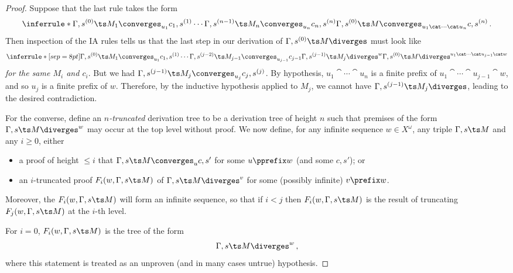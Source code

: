 \begin{proof}
  Suppose that the last rule takes the form
  \[
    \inferrule*{\Gamma,s^{(0)}\ts M_1\converges_{u_1} c_1,s^{(1)} \\ \cdots \\ \Gamma,s^{(n-1)}\ts M_n\converges_{u_n} c_n,s^{(n)}}
    {\Gamma,s^{(0)} \ts M \converges_{u_1\cat \cdots\cat u_n} c,s^{(n)}}\,.
    \]
  Then inspection of the IA rules tells us that the last step in our derivation of $\Gamma,s^{(0)} \ts M\diverges$ must look like
  \[
    \inferrule*[sep=8pt]{\Gamma,s^{(0)}\ts M_1 \converges_{u_1} c_1,s^{(1)} \\ \cdots \\ \Gamma,s^{(j-2)} \ts M_{j-1} \converges_{u_{j-1}} c_{j-1} \\ \Gamma,s^{(j-1)}\ts M_j\diverges^w}
    {\Gamma,s^{(0)} \ts M \diverges^{u_1\cat \cdots \cat u_{j-1}\cat w}}
    \]
  \emph{for the same $M_i$ and $c_i$}.
  But we had $\Gamma,s^{(j-1)}\ts M_j\converges_{u_j} c_j,s^{(j)}$.  
  By hypothesis, $u_1\cat \cdots \cat u_n$ is a finite prefix of $u_1 \cat \cdots \cat u_{j-1} \cat w$, and so $u_j$ is a finite prefix of $w$.  
  Therefore, by the inductive hypothesis applied to $M_j$, we cannot have $\Gamma,s^{(j-1)}\ts M_j\diverges$, leading to the desired contradiction.

  For the converse, define an \emph{$n$-truncated} derivation tree to be a derivation tree of height $n$ such that premises of the form $\Gamma,s\ts M\diverges^w$ may occur at the top level without proof.  
  We now define, for any infinite sequence $w\in X^\omega$, any triple $\Gamma,s\ts M$ and any $i\ge 0$, either
  \begin{itemize}
    \item a proof of height $\le i$ that $\Gamma,s\ts M\converges_u c,s'$ for some $u\pprefix w$ (and some $c,s'$); or
    \item an $i$-truncated proof $F_i(w,\Gamma,s\ts M)$ of $\Gamma,s\ts M\diverges^v$ for some (possibly infinite) $v\prefix w$.
  \end{itemize}
  Moreover, the $F_i(w,\Gamma,s\ts M)$ will form an infinite sequence, so that if $i<j$ then $F_i(w,\Gamma,s\ts M)$ is the result of truncating $F_j(w,\Gamma,s\ts M)$ at the $i$-th level.

  For $i=0$, $F_i(w,\Gamma,s\ts M)$ is the tree of the form
  \[
    \Gamma,s\ts M\diverges^w\,,
    \]
  where this statement is treated as an unproven (and in many cases untrue) hypothesis.


\end{proof}
